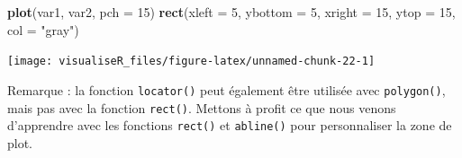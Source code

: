 \documentclass[]{article}
\newenvironment{Shaded}{\begin{snugshade}}{\end{snugshade}}
\newcommand{\DataTypeTok}[1]{\textcolor[rgb]{0.13,0.29,0.53}{#1}}
\newcommand{\DecValTok}[1]{\textcolor[rgb]{0.00,0.00,0.81}{#1}}
\newcommand{\KeywordTok}[1]{\textcolor[rgb]{0.13,0.29,0.53}{\textbf{#1}}}
\newcommand{\NormalTok}[1]{#1}
\newcommand{\StringTok}[1]{\textcolor[rgb]{0.31,0.60,0.02}{#1}}
\begin{document}
\begin{Shaded}
\begin{Highlighting}[]
\KeywordTok{plot}\NormalTok{(var1, var2, }\DataTypeTok{pch =} \DecValTok{15}\NormalTok{)}
\KeywordTok{rect}\NormalTok{(}\DataTypeTok{xleft =} \DecValTok{5}\NormalTok{, }\DataTypeTok{ybottom =} \DecValTok{5}\NormalTok{, }\DataTypeTok{xright =} \DecValTok{15}\NormalTok{, }\DataTypeTok{ytop =} \DecValTok{15}\NormalTok{, }\DataTypeTok{col =} \StringTok{"gray"}\NormalTok{)}
\end{Highlighting}
\end{Shaded}

\begin{center}\texttt{[image: visualiseR\_files/figure-latex/unnamed-chunk-22-1]} \end{center}

Remarque : la fonction \texttt{locator()} peut également être utilisée avec \texttt{polygon()}, mais pas avec la fonction \texttt{rect()}.
Mettons à profit ce que nous venons d'apprendre avec les fonctions \texttt{rect()} et \texttt{abline()} pour personnaliser la zone de plot.
\end{document}
